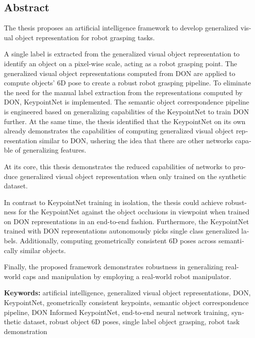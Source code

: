 \begin{otherlanguage}{english}
    \chapter*{Abstract}

    The thesis proposes an artificial intelligence framework to develop generalized visual object representation for robot grasping tasks.

    A single label is extracted from the generalized visual object representation to identify an object on a pixel-wise scale, acting as a robot grasping point.
    The generalized visual object representations computed from DON are applied to compute objects' 6D pose to create a robust robot grasping pipeline.
    To eliminate the need for the manual label
    extraction from the representations computed by DON, KeypointNet is implemented.
    The semantic object correspondence pipeline is engineered based on generalizing capabilities of the KeypointNet to train DON further.
    At the same time, the thesis identified that
    the KeypointNet on its own already demonstrates the capabilities of computing generalized visual object representation similar to DON, ushering the idea that there are other
    networks capable of generalizing features.

    At its core, this thesis demonstrates the reduced capabilities of networks to produce generalized visual object representation when only trained on the synthetic dataset.

    In contrast to KeypointNet training in isolation,
    the thesis could achieve robustness for the KeypointNet against the object occlusions in viewpoint
    when trained on \ac{DON} representations in an end-to-end fashion.
    Furthermore, the KeypointNet trained with \ac{DON} representations
    autonomously picks single class generalized labels.
    Additionally, computing geometrically consistent 6D poses across semantically similar objects.

    Finally, the proposed framework demonstrates robustness in generalizing real-world caps and manipulation by employing a real-world robot manipulator.


    \vfill
    \noindent\textbf{Keywords:} artificial intelligence, generalized visual object representations, \ac{DON}, KeypointNet, geometrically consistent keypoints, semantic object correspondence pipeline, \ac{DON} Informed KeypointNet, end-to-end neural network training, synthetic dataset, robust object 6D poses, single label object grasping,
    robot task demonstration
    \vfill
\end{otherlanguage}
